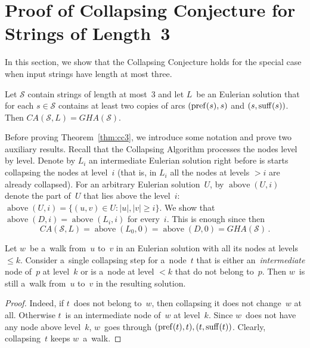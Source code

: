 \section{Proof of Collapsing Conjecture for Strings of Length~3}
\label{subsec:scs3}
In this section, we show that the Collapsing Conjecture holds for 
the special case
when input strings have length at most three.

\begin{theorem}\label{thm:cc3}
Let $\mathcal{S}$ contain strings of length at most~3 and let $L$~be an Eulerian solution that for each $s \in \mathcal{S}$ contains at least two copies of arcs $(\operatorname{pref}(s), s)$ and $(s, \operatorname{suff}(s))$. Then $CA(\mathcal{S}, L)=GHA(\mathcal{S})$.
\end{theorem}

Before proving Theorem~\ref{thm:cc3}, we introduce some notation and 
prove two auxiliary results. Recall that the Collapsing Algorithm processes the nodes level by level. Denote by $L_i$ an intermediate Eulerian solution right before is starts collapsing the nodes at level~$i$ (that is, in $L_i$ all the nodes at levels $>i$ are already collapsed). 
For an arbitrary Eulerian solution~$U$, by $\operatorname{above}(U,i)$ denote the part of~$U$ that lies above the level~$i$: 
$\operatorname{above}(U,i)=\{(u, v) \in U \colon |u|, |v| \ge i\}$.
We show that $\operatorname{above}(D,i)=\operatorname{above}(L_i, i)$ for every~$i$. This is enough since then \[CA(\mathcal{S}, L)=\operatorname{above}(L_0,0)=\operatorname{above}(D,0)=GHA(\mathcal{S}) \, .\]


\begin{lemma}\label{lem:path}
Let $w$~be a~walk from~$u$ to~$v$ in an Eulerian solution with all its nodes at levels~$\le k$. Consider a~single collapsing step for a~node~$t$ that is either an~{\em intermediate} node of~$p$ at level~$k$ or is a~node at level $<k$ that do not belong to~$p$. Then $w$~is still a~walk from~$u$ to~$v$ in the resulting solution. 
\end{lemma}
\begin{proof}
Indeed, if $t$~does not belong to~$w$, then collapsing it does not change~$w$ at all. Otherwise $t$~is an intermediate node of~$w$ at level~$k$. Since $w$~does not have any node above level~$k$, $w$~goes through
$(\operatorname{pref}(t), t), (t, \operatorname{suff}(t))$. Clearly, collapsing~$t$ keeps $w$~a~walk.
\end{proof}

